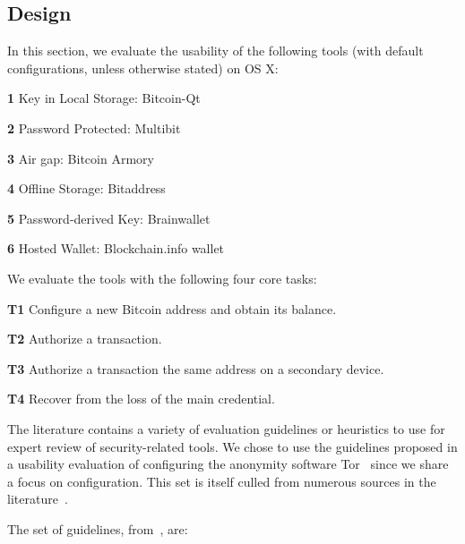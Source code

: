 \subsection{Design}
In this section, we evaluate the usability of the following tools (with default configurations, unless otherwise stated) on OS X:

\begin{compactlist}
	\item[\bf 1] Key in Local Storage: Bitcoin-Qt
	\item[\bf 2] Password Protected: Multibit 
	\item[\bf 3] Air gap: Bitcoin Armory
	\item[\bf 4] Offline Storage: Bitaddress
	\item[\bf 5] Password-derived Key: Brainwallet
	\item[\bf 6] Hosted Wallet: Blockchain.info wallet
\end{compactlist}

We evaluate the tools with the following four core tasks:

\begin{compactlist}
	\item[\bf T1] Configure a new Bitcoin address and obtain its balance.\label{sec:ct-1}
	\item[\bf T2] Authorize a transaction.\label{sec:ct-2}
	\item[\bf T3] Authorize a transaction the same address on a secondary device.\label{sec:ct-3}
	\item[\bf T4] Recover from the loss of the main credential.\label{sec:ct-4}
\end{compactlist}

The literature contains a variety of evaluation guidelines or heuristics to use for expert review of security-related tools. We chose to use the guidelines proposed in a usability evaluation of configuring the anonymity software Tor~\cite{COA07} since we share a focus on configuration. This set is itself culled from numerous sources in the literature~\cite{WRLP94,WT99,Cra03,KBK05,COB06}.

The set of guidelines, from~\cite{COA07}, are:
	
